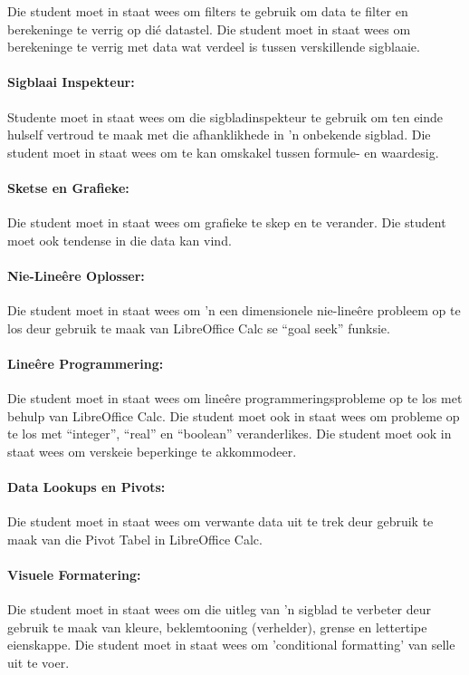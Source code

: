                 Die student moet in staat wees om filters te gebruik om data te
                filter en berekeninge te verrig op di\'{e} datastel.  Die
                student moet in staat wees om berekeninge te verrig met data
                wat verdeel is tussen verskillende sigblaaie.

            \paragraph{Sigblaai Inspekteur:}
                Studente moet in staat wees om die sigbladinspekteur te gebruik
                om ten einde hulself vertroud te maak met die afhanklikhede in
                'n onbekende sigblad.  Die student moet in staat wees om te kan
                omskakel tussen formule- en waardesig.

            \paragraph{Sketse en Grafieke:}
                Die student moet in staat wees om grafieke te skep en te
                verander.  Die student moet ook tendense in die data kan vind.

            \paragraph{Nie-Line\^{e}re Oplosser:}
                Die student moet in staat wees om 'n een dimensionele
                nie-line\^{e}re probleem op te los deur gebruik te maak van
                LibreOffice Calc se ``goal seek'' funksie.

            \paragraph{Line\^{e}re Programmering:}
                Die student moet in staat wees om line\^{e}re
                programmeringsprobleme op te los met behulp van LibreOffice
                Calc. Die student moet ook in staat wees om probleme op te los
                met ``integer'', ``real'' en ``boolean'' veranderlikes.  Die
                student moet ook in staat wees om verskeie beperkinge te
                akkommodeer.

            \paragraph{Data Lookups en Pivots:}
                Die student moet in staat wees om verwante data uit te trek
                deur gebruik te maak van die Pivot Tabel in LibreOffice
                Calc.

            \paragraph{Visuele Formatering:}
                Die student moet in staat wees om die uitleg van 'n sigblad te
                verbeter deur gebruik te maak van kleure, beklemtooning
                (verhelder), grense en lettertipe eienskappe.  Die student moet
                in staat wees om 'conditional formatting' van selle uit te
                voer.
